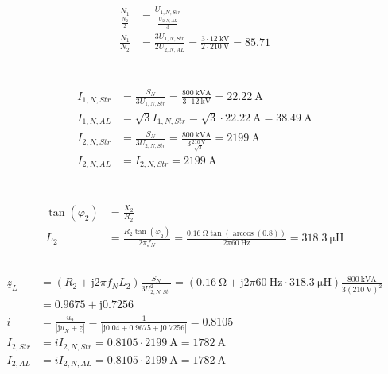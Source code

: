 \documentclass[11pt,a4paper]{scrartcl}
\newcommand{\mybr}[1]{\left(#1\right)}
\renewcommand{\j}{\mathrm{j}}
\newcommand{\z}{\underline{z}}
\newcommand{\0}{_{\mybr{0}}}
\newcommand{\1}{_{\mybr{1}}}
\newcommand{\2}{_{\mybr{2}}}
\newcommand{\ISS}{I_{2,Str}}
\newcommand{\ISA}{I_{2,AL}}
\newcommand{\UPNS}{U_{1,N,Str}}
\newcommand{\USNS}{U_{2,N,Str}}
\newcommand{\USNA}{U_{2,N,AL}}
\newcommand{\IPNS}{I_{1,N,Str}}
\newcommand{\ISNS}{I_{2,N,Str}}
\newcommand{\IPNA}{I_{1,N,AL}}
\newcommand{\ISNA}{I_{2,N,AL}}
\begin{document}
\section{}
\begin{align}
\frac{N_1}{\frac{N_2}{2}}&=\frac{\UPNS}{\frac{\USNA}{3}}\\
\frac{N_1}{N_2}&=\frac{3\UPNS}{2\USNA}=\frac{3\cdot\SI{12}{\kilo\volt}}{2\cdot\SI{210}{\volt}}=\num{85.71}
\end{align}

\section{}
\begin{align}
\IPNS&=\frac{S_N}{3\UPNS}=\frac{\SI{800}{\kilo\volt\ampere}}{3\cdot\SI{12}{\kilo\volt}}=\SI{22.22}{\ampere}\\
\IPNA&=\sqrt{3}\IPNS=\sqrt{3}\cdot\SI{22.22}{\ampere}=\SI{38.49}{\ampere}\\
\ISNS&=\frac{S_N}{3\USNS}=\frac{\SI{800}{\kilo\volt\ampere}}{3\frac{\SI{210}{\volt}}{\sqrt{3}}}=\SI{2199}{\ampere}\\
\ISNA&=\ISNS=\SI{2199}{\ampere}
\end{align}

\section{}
\subsection{}
\begin{align}
\tan\mybr{\varphi_2}&=\frac{X_2}{R_2}\\
L_2&=\frac{R_2\tan\mybr{\varphi_2}}{2\pi f_N}=\frac{\SI{0.16}{\ohm}\tan\mybr{\arccos\mybr{0.8}}}
{2\pi\SI{60}{\hertz}}=\SI{318.3}{\micro\henry}
\end{align}

\subsection{}
\begin{align}
\z_L&=\mybr{R_2+\j 2\pi f_N L_2}\frac{S_N}{3\USNS^2}=\mybr{\SI{0.16}{\ohm}+\j2\pi\SI{60}{\hertz}\cdot\SI{318.3}{\micro\henry}}\frac{\SI{800}{\kilo\volt\ampere}}{3\mybr{\SI{210}{\volt}}^2}\\
&=\num{0.9675}+\j\num{0.7256}\label{eq:alterWiderstand}\\
i&=\frac{u_2}{\left|\j u_X+\z\right|}=\frac{1}{\left|\j\num{0.04}+\num{0.9675}+\j\num{0.7256}\right|}=\num{0.8105}\\
\ISS&=i\ISNS=\num{0.8105}\cdot\SI{2199}{\ampere}=\SI{1782}{\ampere}\\
\ISA&=i\ISNA=\num{0.8105}\cdot\SI{2199}{\ampere}=\SI{1782}{\ampere}
\end{align}
\end{document}
